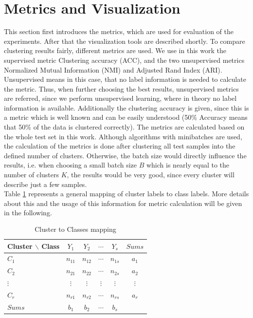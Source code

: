 \documentclass[12pt,DIV14,BCOR12mm,a4paper,footexclude,headinclude,halfparskip-,twoside,openright,cleardoubleempty,idxtotoc,bibtotoc,listtotoc]{scrreprt} %
\numberwithin{equation}{chapter}
\begin{document}
\section{Metrics and Visualization}
This section first introduces the metrics, which are used for evaluation of the experiments. After that the visualization tools are described shortly. To compare clustering results fairly, different metrics are used. We use in this work the supervised metric Clustering accuracy (ACC), and the two unsupervised metrics Normalized Mutual Information (NMI) and Adjusted Rand Index (ARI). Unsupervised means in this case, that no label information is needed to calculate the metric. Thus, when further choosing the best results, unsupervised metrics are referred, since we perform unsupervised learning, where in theory no label information is available. Additionally the clustering accuracy is given, since this is a metric which is well known and can be easily understood (50\% Accuracy means that 50\% of the data is clustered correctly). The metrics are calculated based on the whole test set in this work. Although algorithms with minibatches are used, the calculation of the metrics is done after clustering all test samples into the defined number of clusters. Otherwise, the batch size would directly influence the results, i.e. when choosing a small batch size $B$ which is nearly equal to the number of clusters $K$, the results would be very good, since every cluster will describe just a few samples.\\
Table \ref{tab:ClusterClassesmapping} represents a general mapping of cluster labels to class labels. More details about this and the usage of this information for metric calculation will be given in the following.
	\begin{table}[htb!]
    		\centering
    		\caption{Cluster to Classes mapping}
    		\label{tab:ClusterClassesmapping}
    		\begin{tabular}{l|cccc|c}
        		Cluster $\backslash$ Class & $Y_1$ & $Y_2$ & $\cdots$ & $Y_s$ & $Sums$\\ \hline
        		$C_1$ & $n_{11}$ & $n_{12}$ & $\cdots$ & $n_{1s}$ & $a_1$\\
        		$C_2$ & $n_{21}$ & $n_{22}$ & $\cdots$ & $n_{2s}$ & $a_2$\\
        		$\vdots$ & $\vdots$ & $\vdots$ & $\vdots$ & $\vdots$ & $\vdots$\\
        		$C_r$ & $n_{r1}$ & $n_{r2}$ & $\cdots$ & $n_{rs}$ & $a_r$\\ \hline
        		$Sums$ & $b_1$ & $b_2$ & $\cdots$ & $b_s$ & \\
    		\end{tabular}
	\end{table}
\end{document}
